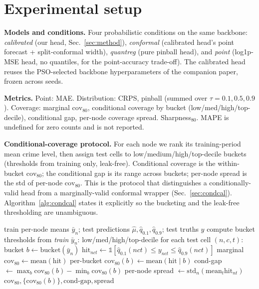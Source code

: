 \documentclass[11pt,conference]{IEEEtran}
\begin{document}
\section{Experimental setup}\label{sec:setup}
\textbf{Models and conditions.} Four probabilistic conditions on the same
backbone: \emph{calibrated} (our head, Sec.~\ref{sec:method}), \emph{conformal}
(calibrated head's point forecast + split-conformal width), \emph{quantreg} (pure
pinball head), and \emph{point} (log1p-MSE head, no quantiles, for the
point-accuracy trade-off). The calibrated head reuses the PSO-selected backbone
hyperparameters of the companion paper, frozen across seeds.

\textbf{Metrics.} Point: MAE. Distribution: CRPS, pinball (summed over
$\tau{=}0.1,0.5,0.9$). Coverage: marginal $\mathrm{cov}_{80}$, conditional
coverage by bucket (low/med/high/top-decile), conditional gap, per-node coverage
spread. Sharpness$_{80}$. MAPE is undefined for zero counts and is not reported.

\textbf{Conditional-coverage protocol.} For each node we rank its training-period
mean crime level, then assign test cells to low/medium/high/top-decile buckets
(thresholds from training only, leak-free). Conditional coverage is the
within-bucket $\mathrm{cov}_{80}$; the conditional gap is its range across
buckets; per-node spread is the std of per-node $\mathrm{cov}_{80}$. This is the
protocol that distinguishes a conditionally-valid head from a marginally-valid
conformal wrapper (Sec.~\ref{sec:condcal}). Algorithm~\ref{alg:condcal} states it
explicitly so the bucketing and the leak-free thresholding are unambiguous.

\begin{algorithm}[t]
\caption{Conditional-coverage evaluation (one condition, one city)}\label{alg:condcal}
\begin{algorithmic}[1]
\Require train per-node means $\bar y_n$; test predictions $\hat\mu,\hat q_{0.1},\hat q_{0.9}$; test truths $y$
\State compute bucket thresholds from \emph{train} $\bar y_n$: low/med/high/top-decile
\State for each test cell $(n,c,t)$: bucket $b\gets\mathrm{bucket}(\bar y_n)$
\State $\mathrm{hit}_{nct}\gets \mathbb{1}[\hat q_{0.1}(nct)\le y_{nct}\le \hat q_{0.9}(nct)]$
\State marginal $\mathrm{cov}_{80}\gets \mathrm{mean}(\mathrm{hit})$
\State per-bucket $\mathrm{cov}_{80}(b)\gets \mathrm{mean}(\mathrm{hit}\mid b)$
\State cond-gap $\gets \max_b\mathrm{cov}_{80}(b)-\min_b\mathrm{cov}_{80}(b)$
\State per-node spread $\gets \mathrm{std}_n(\mathrm{mean}_t\mathrm{hit}_{nt})$
\State \Return $\mathrm{cov}_{80},\{\mathrm{cov}_{80}(b)\},\text{cond-gap},\text{spread}$
\end{algorithmic}
\end{algorithm}
\end{document}
